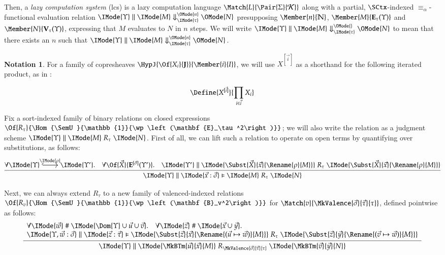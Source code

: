 \documentclass[11pt]{article}
\theoremstyle{definition}
\theoremstyle{notation}
\newtheorem*{notation*}{Notation}
\theoremstyle{remark}
\numberwithin{equation}{section}
\newcommand\Pow[1]{\wp\left(#1\right)}
\newcommand\EvalN[5]{\IMode{#1}\parallel\IMode{#4}\Downarrow^{\OMode{#3}}_{\IMode{#2}}\OMode{#5}}
\newcommand\Eval[4]{\EvalN{#1}{#2}{}{#3}{#4}}
\newcommand\Exprs{\mathbf{E}}
\newcommand\Values{\mathbf{V}}
\newcommand\BTms{\mathbf{B}}
\newcommand\Naturals{\mathbb{N}}
\begin{document}
Then, a \emph{lazy computation system} (lcs) is a lazy computation language
$\Match{L}{\Pair{\Sigma}{\CanOperators}}$ along with a partial, $\SCtx$-indexed
$\equiv_\alpha$-functional evaluation relation
$\EvalN{\Upsilon}{\tau}{n}{M}{N}$ presupposing $\Member{n}{\Naturals}$,
$\Member{M}{\Exprs_\tau(\Upsilon)}$ and $\Member{N}{\Values_\tau(\Upsilon)}$,
expressing that $M$ evaluates to $N$ in $n$ steps.  We will write
$\Eval{\Upsilon}{\tau}{M}{N}$ to mean that there exists an $n$ such that
$\EvalN{\Upsilon}{\tau}{n}{M}{N}$.

\newcommand\SBinRel[4]{\IMode{#2}\parallel\IMode{#3}\mathrel{#1}\IMode{#4}}
\newcommand\OSBinRel[5]{\IMode{#2}\parallel\IMode{#3}\vDash\IMode{#4}\mathrel{#1}\IMode{#5}}

\begin{notation*}
  For a family of copresheaves $\HypJ{\Of{X_i}{\SemU}}{\Member{i}{I}}$, we will
  use $X^{[\vec{i}]}$ as a shorthand for the following iterated product, as
  in \cite{sterling-morrison:2015}:

  \[
    \Define{
      X^{[\vec{i}]}
    }{
      \prod_{i\in\vec{i}}
        X_i
    }
  \]
\end{notation*}

Fix a sort-indexed family of binary relations on closed expressions
$\Of{R_\tau}{\Hom{\SemU}{\mathbb{1}}{\Pow{\Exprs_\tau^2}}}$; we will
also write the relation as a judgment scheme
$\SBinRel{R_\tau}{\Upsilon}{M}{N}$. First of all, we can lift such a relation
to operate on open terms by quantifying over substitutions, as follows:
\[
  \infer{
    \OSBinRel{R_\tau}{\Upsilon}{\vec{x}:\vec{\sigma}}{M}{N}
  }{
    \forall
      \begin{tikzcd}[cramped, ampersand replacement = \&]
         \IMode{\Upsilon} \arrow[r,hook,"\IMode{\rho}"] \&\IMode{\Upsilon'}
      \end{tikzcd}.
    \quad
    \forall \Of{\vec{X}}{\Exprs^{[\vec{\sigma}]}(\Upsilon')}.
    \quad
    \SBinRel{R_\tau}{\Upsilon'}{
      \Subst{\vec{X}}{\vec{x}}{\Rename{\rho}{M}}
    }{
      \Subst{\vec{X}}{\vec{x}}{\Rename{\rho}{M}}
    }
  }
\]

Next, we can always extend $R_\tau$ to a new
family of valenced-indexed relations
$\Of{R_v}{\Hom{\SemU}{\mathbb{1}}{\Pow{\BTms_v^2}}}$ for
$\Match{v}{\MkValence{\vec{\sigma}}{\vec{\tau}}{\tau}}$, defined pointwise as
follows:
\[
  \infer{
    \SBinRel{R_{\MkValence{\vec{\sigma}}{\vec{\tau}}{\tau}}}{\Upsilon}{
      \MkBTm{\vec{u}}{\vec{x}}{M}
    }{
      \MkBTm{\vec{v}}{\vec{y}}{N}
    }
  }{
    \begin{array}{l}
      \forall\IMode{\vec{w}}\mathrel{\#}\IMode{\Dom{\Upsilon}\cup\vec{u}\cup\vec{v}}.\quad
      \forall\IMode{\vec{z}}\mathrel{\#}\IMode{\vec{x}\cup\vec{y}}.\\
      \OSBinRel{R_\tau}{\Upsilon,\vec{w}:\vec{\sigma}}{\vec{z}:\vec{\tau}}{
        \Subst{\vec{z}}{\vec{x}}{
          \Rename{(\vec{u}\mapsto\vec{w})}{M}
        }
      }{
        \Subst{\vec{z}}{\vec{y}}{
          \Rename{(\vec{v}\mapsto\vec{w})}{M}
        }
      }
    \end{array}
  }
\]
\end{document}
